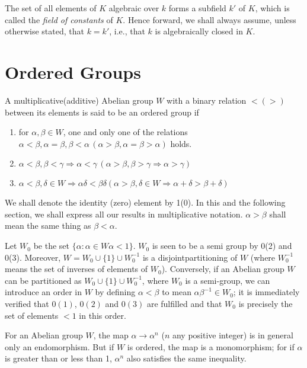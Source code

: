 The set of all elements of $K$ algebraic over $k$ forms a subfield
$k'$ of $K$, which is called the \textit{field of constants } of
$K$. Hence forward, we shall always assume, unless otherwise stated,
that $k = k'$,  i.e., that $k$ is algebraically closed in $K$. 

\section{Ordered Groups}\label{chap1:sec2}

\begin{defi*}
  A multiplicative(additive) Abelian group $W$ with a binary relation
  $< (>)$ between its elements is said to be an ordered group if 
\end{defi*}

\begin{enumerate}[\rm 0(1)]
\item for $\alpha ,\beta \in W$, one and only one of the relations
  $\alpha < \beta, \alpha = \beta, \beta < \alpha \, (\alpha > \beta ,
  \alpha = \beta > \alpha)$ holds. 
\item $\alpha < \beta , \beta < \gamma \Rightarrow \alpha < \gamma\, 
  (\alpha > \beta , \beta > \gamma \Rightarrow \alpha > \gamma)$ 
\item $\alpha < \beta, \delta \in W \Rightarrow \alpha \delta < \beta
  \delta (\alpha > \beta, \delta \in W \Rightarrow \alpha + \delta >
  \beta + \delta)$ 
\end{enumerate}

We shall denote the identity  (zero) element by 1(0). In this and the
following section, we shall express all our results in multiplicative
notation. $\alpha > \beta$ shall mean the same thing as $\beta <
\alpha$. 

Let $W_0$ be the set $\{\alpha : \alpha \in W \alpha < 1\}$. $W_0$ is
seen to be a semi group by 0(2) and 0(3). Moreover, $W = W_0 \cup \{ 1\}
\cup W^{-1}_0$ is a disjoint\pageoriginale partitioning of $W$ (where $W^{-1}_0$ means
the set of inverses of elements of $W_0$). Conversely, if an Abelian
group $W$ can be partitioned as $W_0 \cup \{ 1 \} \cup W^{-1}_0$, where $W_0$
is a semi-group, we can introduce an order in $W$ by defining $\alpha
< \beta$ to mean $\alpha \beta^{-1} \in W_0$; it is immediately
verified that $0(1)$, $0(2)$ and $0(3)$ are fulfilled and that $W_0$ is
precisely the set of elements $< 1$ in this order. 

For an Abelian group $W$, the map $\alpha \rightarrow \alpha^n$ ($n$
any positive integer) is in general only an endomorphism. But if $W$
is ordered, the map is a monomorphism; for if $\alpha$ is greater than
or less  than 1, $\alpha^n$ also satisfies the same inequality. 

